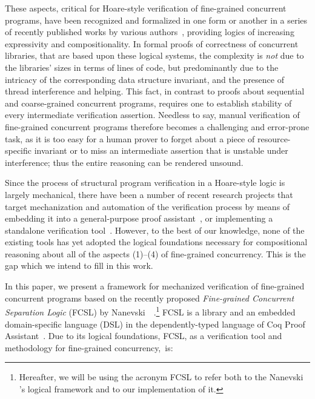 These aspects, critical for Hoare-style verification of fine-grained
concurrent programs, have been recognized and formalized in one form
or another in a series of recently published works by various
authors~\cite{Feng-al:ESOP07,Vafeiadis-Parkinson:CONCUR07,Feng:POPL09,DinsdaleYoung-al:ECOOP10,Jacobs-Piessens:POPL11,Turon-al:ICFP13,Nanevski-al:ESOP14,Svendsen-Birkedal:ESOP14,ArrozPincho-al:ECOOP14,Jung-al:POPL15,Raad-al:colosl},
providing logics of increasing expressivity and compositionality.
% 
In formal proofs of correctness of concurrent libraries, that are
based upon these logical systems, the complexity is \emph{not} due to
the libraries' sizes in terms of lines of code, but predominantly due
to the intricacy of the corresponding data structure invariant, and
the presence of thread interference and helping. This fact, in
contrast to proofs about sequential and coarse-grained concurrent
programs, requires one to establish stability of every intermediate
verification assertion.
%
Needless to say, manual verification of fine-grained concurrent
programs therefore becomes a challenging and error-prone task, as it
is too easy for a human prover to forget about a piece of
resource-specific invariant or to miss an intermediate assertion that
is unstable under interference; thus the entire reasoning can be
rendered unsound.
%

Since the process of structural program verification in a Hoare-style
logic is largely mechanical, there have been a number of recent
research projects that target mechanization and automation of the
verification process by means of embedding it into a general-purpose
proof
assistant~\cite{Nanevski-al:ICFP08,Nanevski-al:POPL10,Shao:CACM10,Chlipala:PLDI11},
or implementing a standalone verification
tool~\cite{Leino-Muller:ESOP09,Cohen-al:TPHOL09,Jacobs-al:NFM11}. However,
to the best of our knowledge, none of the existing tools has yet
adopted the logical foundations necessary for compositional reasoning
about all of the aspects (1)--(4) of fine-grained concurrency. This is
the gap which we intend to fill in this work.

In this paper, we present a framework for mechanized verification of
fine-grained concurrent programs based on the recently proposed
\emph{Fine-grained Concurrent Separation Logic} (FCSL) by
Nanevski~\etal~\cite{Nanevski-al:ESOP14}.\footnote{Hereafter, we
  will be using the acronym FCSL to refer both to the Nanevski \etal's
  logical framework and to our implementation of it.}
% 
FCSL is a library and an embedded domain-specific language (DSL) in
the dependently-typed language of Coq Proof
Assistant~\cite{Coq-manual}.
% 
Due to its logical foundations, FCSL, as a verification tool and
methodology for fine-grained concurrency,~is:

